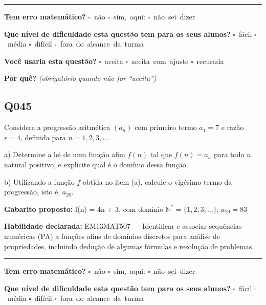 \documentclass[11pt,a4paper]{article}
\begin{document}
\noindent\rule{\linewidth}{0.4pt}
\textbf{Tem erro matemático?}\quad
\mbox{$\square$~não} \quad \mbox{$\square$~sim, aqui:} \underline{\hspace{5cm}}
\quad \mbox{$\square$~não sei dizer}

\textbf{Que nível de dificuldade esta questão tem para os seus alunos?}\quad
\mbox{$\square$~fácil} \quad \mbox{$\square$~média} \quad
\mbox{$\square$~difícil} \quad \mbox{$\square$~fora do alcance da turma}

\textbf{Você usaria esta questão?}\quad
\mbox{$\square$~aceita} \quad \mbox{$\square$~aceita com ajuste} \quad
\mbox{$\square$~recusada}

\textbf{Por quê?} \emph{(obrigatório quando não for ``aceita'')}

\underline{\hspace{\linewidth}}

\underline{\hspace{\linewidth}}
\vspace{0.6em}

\begin{samepage}
\subsection*{Q045}
Considere a progressão aritmética $(a_n)$ com primeiro termo $a_1 = 7$ e razão $r = 4$, definida para $n = 1, 2, 3, \dots$

a) Determine a lei de uma função afim $f(n)$ tal que $f(n) = a_n$ para todo $n$ natural positivo, e explicite qual é o domínio dessa função.

b) Utilizando a função $f$ obtida no item (a), calcule o vigésimo termo da progressão, isto é, $a_{20}$.

\textbf{Gabarito proposto:} f(n) = 4n + 3, com domínio $\mathbb{N}^* = \{1,2,3,\dots\}$; $a_{20} = 83$

\textbf{Habilidade declarada:} EM13MAT507 --- Identificar e associar sequências numéricas (PA) a funções afins de domínios discretos para análise de propriedades, incluindo dedução de algumas fórmulas e resolução de problemas.
\end{samepage}

\noindent\rule{\linewidth}{0.4pt}
\textbf{Tem erro matemático?}\quad
\mbox{$\square$~não} \quad \mbox{$\square$~sim, aqui:} \underline{\hspace{5cm}}
\quad \mbox{$\square$~não sei dizer}

\textbf{Que nível de dificuldade esta questão tem para os seus alunos?}\quad
\mbox{$\square$~fácil} \quad \mbox{$\square$~média} \quad
\mbox{$\square$~difícil} \quad \mbox{$\square$~fora do alcance da turma}
\end{document}

